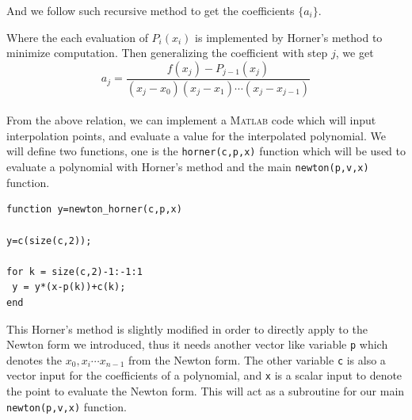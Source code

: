 \documentclass[paper=a4, fontsize=11pt]{scrartcl}
\newcommand{\MATLAB}{\textsc{Matlab}\xspace}
\begin{document}
And we follow such recursive method to get the coefficients $\{a_i\}$.\\


Where the each evaluation of $P_i(x_i)$ is implemented by Horner's method to minimize computation. Then generalizing the coefficient with step $j$, we get \\

\begin{equation} \nonumber
	a_j = \frac{f(x_j) - P_{j-1}(x_j)}{(x_j - x_0)(x_j - x_1) \cdots (x_j - x_{j-1})}
\end{equation}\\

From the above relation, we can implement a \MATLAB code which will input interpolation points, and evaluate a value for the interpolated polynomial. We will define two functions, one is the \texttt{horner(c,p,x)} function which will be used to evaluate a polynomial with Horner's method and the main \texttt{newton(p,v,x)} function.\\

\begin{lstlisting}[caption='newton\_horner.m']
function y=newton_horner(c,p,x) 

y=c(size(c,2)); 

for k = size(c,2)-1:-1:1 
 y = y*(x-p(k))+c(k);
end
\end{lstlisting}
\vspace{0.15in}

This Horner's method is slightly modified in order to directly apply to the Newton form we introduced, thus it needs another vector like variable \texttt{p} which denotes the $x_0,x_i \cdots x_{n-1}$ from the Newton form. The other variable \texttt{c} is also a vector input for the coefficients of a polynomial, and \texttt{x} is a scalar input to denote the point to evaluate the Newton form. This will act as a subroutine for our main \texttt{newton(p,v,x)} function. \\
\end{document}
